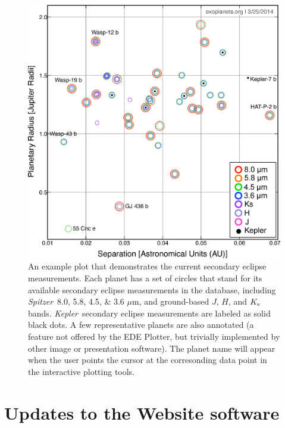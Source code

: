 \documentclass[11pt,preprint]{aastex}
\def\micron{$\mu$m}
\def\kepler{\textit{Kepler}}
\def\spitzer{\textit{Spitzer}}
\def\micron{$\mu$m}
\begin{document}
\begin{CJK*}{UTF8}{gbsn}
\begin{figure}[!htb]
\centering
\includegraphics[width=\textwidth]{../fig/senew.eps}
\caption{An example plot that demonstrates the current secondary
  eclipse measurements. Each planet has a set of circles that stand
  for its available secondary eclipse measurements in the database,
  including \spitzer\ 8.0, 5.8, 4.5, \& 3.6 \micron, and ground-based
  $J$, $H$, and $K_{\rm s}$ bands. \kepler\ secondary eclipse measurements
  are labeled as solid black dots. A few representative planets are
  also annotated (a feature not offered by the EDE Plotter, but
  trivially implemented by other image or presentation software). The
  planet name will appear when the user points the cursor at the
  corresonding data point in the interactive plotting tools.}
\label{fig:se}
\end{figure}


\section{Updates to the Website software}\label{sec:website}


\end{CJK*}
\end{document}
